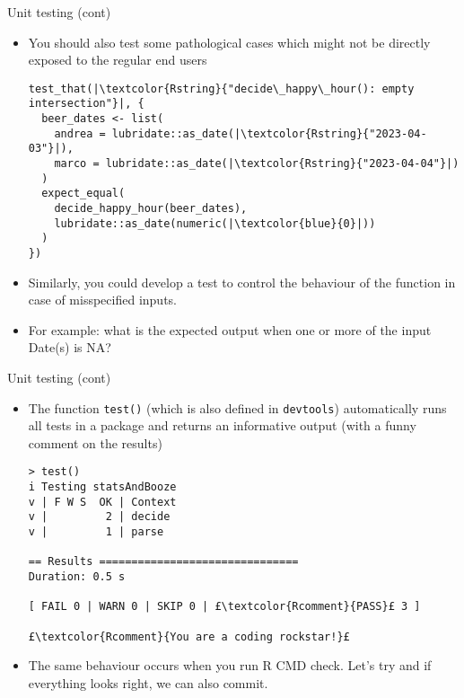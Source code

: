 \documentclass[
hyperref={bookmarks=false},
xcolor={dvipsnames,svgnames*,x11names*}, 
12pt
]{beamer}
\begin{document}
\begin{frame}[fragile]{Unit testing (cont)}
\vspace{-0.5cm}
\begin{itemize}
\itemsep 1ex
\item You should also test some pathological cases which might not be directly exposed to the regular end users
\begin{lstlisting}
test_that(|\textcolor{Rstring}{"decide\_happy\_hour(): empty intersection"}|, {
  beer_dates <- list(
    andrea = lubridate::as_date(|\textcolor{Rstring}{"2023-04-03"}|),
    marco = lubridate::as_date(|\textcolor{Rstring}{"2023-04-04"}|)
  )
  expect_equal(
    decide_happy_hour(beer_dates),
    lubridate::as_date(numeric(|\textcolor{blue}{0}|))
  )
})
\end{lstlisting}
\item Similarly, you could develop a test to control the behaviour of the function in case of misspecified inputs. 
\item For example: what is the expected output when one or more of the input Date(s) is NA?
\end{itemize}
\end{frame}


\begin{frame}[fragile]{Unit testing (cont)}
\vspace{-0.5cm}
\begin{itemize}
\itemsep 2ex
\item The function \texttt{test()} (which is also defined in \texttt{devtools}) automatically runs all tests in a package and returns an informative output (with a funny comment on the results)
\begin{lstlisting}
> test()
i Testing statsAndBooze
v | F W S  OK | Context
v |         2 | decide
v |         1 | parse

== Results ===============================
Duration: 0.5 s

[ FAIL 0 | WARN 0 | SKIP 0 | £\textcolor{Rcomment}{PASS}£ 3 ] 

£\textcolor{Rcomment}{You are a coding rockstar!}£
\end{lstlisting}
\item The same behaviour occurs when you run R CMD check. Let's try and if everything looks right, we can also commit.  
\end{itemize}
\end{frame}
\end{document}
